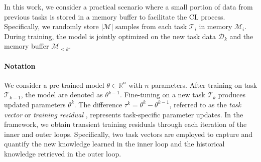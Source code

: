 In this work, we consider a practical scenario where a small portion of data from previous tasks is stored in a memory buffer to facilitate the CL process. 
Specifically, we randomly store $\left| \mathcal{M} \right|$ samples from each task $\mathcal{T}_i$ in memory $\mathcal{M}_i$. During training, the model is jointly optimized on the new task data $\mathcal{D}_k$ and the memory buffer $\mathcal{M}_{<k}$.



\paragraph{Notation}
We consider a pre-trained model $\theta \in \mathbb{R}^n$ with $n$ parameters.
After training on task $\mathcal{T}_{k-1}$, the model are denoted as $\theta^{k-1}$.
Fine-tuning on a new task $\mathcal{T}_k$ produces updated parameters $\theta^k$.
The difference $\tau^k = \theta^k - \theta^{k-1}$, referred to as the \textit{task vector} or \textit{training residual} \cite{ilharco2023editing}, represents task-specific parameter updates.
In the {\ouralg} framework, we obtain transient training residuals through each iteration of the inner and outer loops. Specifically, two task vectors are employed to capture and quantify the new knowledge learned in the inner loop and the historical knowledge retrieved in the outer loop. %



